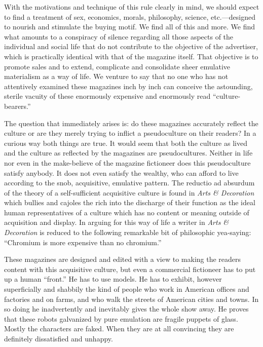 \documentclass[twoside,nohyper,openany,nobib]{tufte-book}
\begin{document}
With the motivations and technique of this rule clearly in mind, we
should expect to find a treatment of sex, economics, morals, philosophy,
science, etc.---designed to nourish and stimulate the buying motif. We
find all of this and more. We find what amounts to a conspiracy of
silence regarding all those aspects of the individual and social life
that do not contribute to the objective of the advertiser, which is
practically identical with that of the magazine itself. That objective
is to promote sales and to extend, complicate and consolidate sheer
emulative materialism as a way of life. We venture to say that no one
who has not attentively examined these magazines inch by inch can
conceive the astounding, sterile vacuity of these enormously expensive
and enormously read ``culture-bearers.''

The question that immediately arises is: do these magazines accurately
reflect the culture or are they merely trying to inflict a pseudoculture
on their readers? In a curious way both things are true. It would seem
that both the culture as lived and the culture as reflected by the
magazines are pseudocultures. Neither in life nor even in the
make-believe of the magazine fictioneer does this pseudoculture satisfy
anybody. It does not even satisfy the wealthy, who can afford to live
according to the snob, acquisitive, emulative pattern. The reductio ad
absurdum of the theory of a self-sufficient acquisitive culture is found
in \emph{Arts \& Decoration} which bullies and cajoles the rich into the
discharge of their function as the ideal human representatives of a
culture which has no content or meaning outside of acquisition and
display. In arguing for this way of life a writer in \emph{Arts \&
Decoration} is reduced to the following remarkable bit of philosophic
yea-saying: ``Chromium is more expensive than no chromium.''

These magazines are designed and edited with a view to making the
readers content with this acquisitive culture, but even a commercial
fictioneer has to put up a human ``front.'' He has to use models. He has
to exhibit, however superficially and shabbily the kind of people who
work in American offices and factories and on farms, and who walk the
streets of American cities and towns. In so doing he inadvertently and
inevitably gives the whole show away. He proves that these robots
galvanized by pure emulation are fragile puppets of glass. Mostly the
characters are faked. When they are at all convincing they are
definitely dissatisfied and unhappy.
\end{document}
